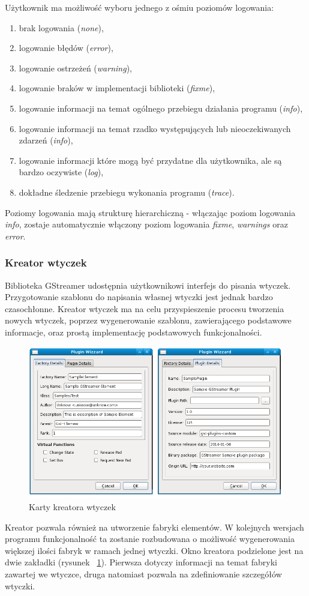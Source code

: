 \documentclass[12pt]{article}
\begin{document}
Użytkownik ma możliwość wyboru jednego z ośmiu poziomów logowania:
\begin{enumerate}
 \setlength{\itemsep}{0em}
\item brak logowania (\textit{none}),
\item logowanie błędów (\textit{error}),
\item logowanie ostrzeżeń (\textit{warning}),
\item logowanie braków w implementacji biblioteki (\textit{fixme}),
\item logowanie informacji na temat ogólnego przebiegu działania programu (\textit{info}),
\item logowanie informacji na temat rzadko występujących lub nieoczekiwanych zdarzeń (\textit{info}),
\item logowanie informacji które mogą być przydatne dla użytkownika, ale są bardzo oczywiste (\textit{log}),
\item dokładne śledzenie przebiegu wykonania programu (\textit{trace}).
\end{enumerate}
Poziomy logowania mają strukturę hierarchiczną - włączając poziom logowania \textit{info}, zostaje automatycznie włączony poziom logowania \textit{fixme}, \textit{warnings} oraz \textit{error}.
\subsubsection{Kreator wtyczek}
Biblioteka GStreamer udostępnia użytkownikowi interfejs do pisania wtyczek. Przygotowanie szablonu do napisania własnej wtyczki jest jednak bardzo czasochłonne. Kreator wtyczek ma na celu przyspieszenie procesu tworzenia nowych wtyczek, poprzez wygenerowanie szablonu, zawierającego podstawowe informacje, oraz prostą implementację podstawowych funkcjonalności.
\begin{figure}[H]
  \includegraphics[width=160mm]{img/plugin-wizzard.png}
  \caption{Karty kreatora wtyczek}
  \label{fig:pluginWizzard}
\end{figure}
Kreator pozwala również na utworzenie fabryki elementów. W kolejnych wersjach programu funkcjonalność ta zostanie rozbudowana o możliwość wygenerowania większej ilości fabryk w ramach jednej wtyczki.
Okno kreatora podzielone jest na dwie zakładki (rysunek ~\ref{fig:pluginWizzard}). Pierwsza dotyczy informacji na temat fabryki zawartej we wtyczce, druga natomiast pozwala na zdefiniowanie szczegółów wtyczki.
\end{document}
